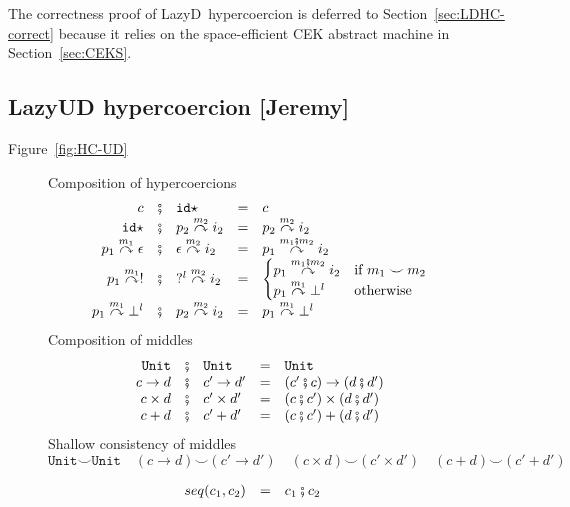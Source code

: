 \documentclass[acmsmall,review,anonymous]{acmart}\settopmatter{printfolios=true,printccs=false,printacmref=false}
\newcommand{\secref}[1]{Section~\ref{#1}}
\newcommand{\funrule}[3]{#1 &=& #2 & #3\\}
\newcommand{\lazyUD}{Lazy\;UD}
\newcommand{\lazyD}{Lazy\;D}
\newcommand{\POOunit}[0]{\mathtt{Unit}}
\newcommand{\hyperCoercionI}[0]{\mathtt{id\star}}
\newcommand{\hyperCoercionC}[3]{#1 \overset{#2}{\curvearrowright} #3}
\begin{document}
The correctness proof of \lazyD\ hypercoercion is deferred to 
\secref{sec:LDHC-correct} 
because it relies on the space-efficient CEK abstract machine in 
\secref{sec:CEKS}.

\subsection{\lazyUD{} hypercoercion [Jeremy]}


Figure~\ref{fig:HC-UD}

\begin{figure}
  Composition of hypercoercions 
  \[
  \begin{array}{rclclr}
  c &\fatsemi& \hyperCoercionI{} &=& c\\
  \hyperCoercionI{} &\fatsemi& \hyperCoercionC{p_2}{m_2}{i_2} &=&
       \hyperCoercionC{p_2}{m_2}{i_2} \\
  \hyperCoercionC{p_1}{m_1}{\epsilon} &\fatsemi& \hyperCoercionC{\epsilon}{m_2}{i_2} &=&
       \hyperCoercionC{p_1}{m_1 \fatsemi m_2}{i_2} \\
  \hyperCoercionC{p_1}{m_1}{!} &\fatsemi& \hyperCoercionC{?^l}{m_2}{i_2} &=&
  \begin{cases}
    \hyperCoercionC{p_1}{m_1 \fatsemi m_2}{i_2} & \text{if } m_1 \smile m_2 \\
    \hyperCoercionC{p_1}{m_1}{\bot^l} & \text{otherwise}
  \end{cases} \\
  \hyperCoercionC{p_1}{m_1}{\bot^l} &\fatsemi& \hyperCoercionC{p_2}{m_2}{i_2} &=&
     \hyperCoercionC{p_1}{m_1}{\bot^l}
  \end{array}
  \]
  Composition of middles 
  \[
  \begin{array}{rclclr}  
  \POOunit &\fatsemi& \POOunit &=& \POOunit \\
  c \to d &\fatsemi& c' \to d' &=& (c' \fatsemi c) \to (d \fatsemi d') \\
  c \times d &\fatsemi& c' \times d' &=& (c \fatsemi c') \times (d \fatsemi d') \\
  c + d &\fatsemi& c' + d' &=& (c \fatsemi c') + (d \fatsemi d')
  \end{array}
  \]
  Shallow consistency of middles 
  \[
  \POOunit \smile \POOunit \quad
  (c \to d) \smile (c' \to d') \quad
  (c \times d) \smile (c' \times d') \quad
  (c + d) \smile (c' + d')
  \]

  \[
  \begin{array}{rclr}
    \funrule{seq(c_1,c_2)}{
      c_1 \fatsemi c_2
    }{}
  \end{array}
  \]
  

\end{figure}
\end{document}
